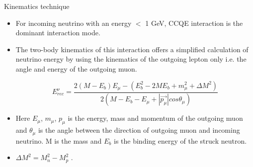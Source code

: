\documentclass[9pt]{beamer}    %
\begin{document}
\begin{frame}{Kinematics technique}
\begin{itemize}
 \item For incoming neutrino with an energy $<$ 1 GeV, CCQE interaction is the dominant interaction mode.
 \item The two-body  kinematics of this interaction offers a simplified calculation of neutrino energy by using the kinematics of the outgoing lepton only i.e. the angle and energy of the outgoing muon.

\begin{equation}
 E_{rec}^{\nu} = \frac{2(M - E_{b})E_{\mu} - (E_{b}^{2} - 2ME_{b} + m_ {\mu}^{2} + \Delta M^{2})}{2(M - E_{b}- E_{\mu} + |\vec{p_{\mu}}|cos \theta_{\mu})}
\end{equation}
\item Here $E_{\mu}$, $m_{\mu}$, $p_{\mu}$ is the energy, mass and momentum of the outgoing muon and $\theta_{\mu}$ is the angle between the direction of outgoing muon and incoming neutrino. M is the mass and $E_{b}$ is the binding energy of the struck neutron.
\item $\Delta M^{2} = M_{n}^{2} - M_{p}^{2}$ .

\end{itemize}
\end{frame}
\end{document}
